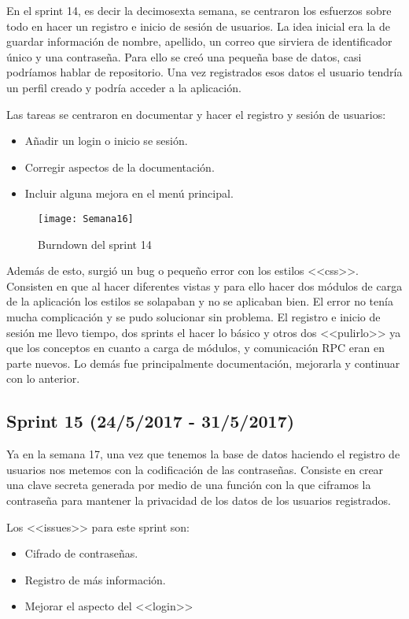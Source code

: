 En el sprint 14, es decir la decimosexta semana, se centraron los esfuerzos sobre todo en hacer un registro e inicio de sesión de usuarios. La idea inicial era la de guardar información de nombre, apellido, un correo que sirviera de identificador único y una contraseña. Para ello se creó una pequeña base de datos, casi podríamos hablar de repositorio. Una vez registrados esos datos el usuario tendría un perfil creado y podría acceder a la aplicación.

Las tareas se centraron en documentar y hacer el registro y sesión de usuarios:
\begin{itemize}
\item Añadir un login o inicio se sesión.
\item Corregir aspectos de la documentación.
\item Incluir alguna mejora en el menú principal.
\end{itemize}

\begin{figure}[h]
\centering
\texttt{[image: Semana16]}
\caption{Burndown del sprint 14}
\label{fig:A.2.6}
\end{figure}

Además de esto, surgió un bug o pequeño error con los estilos <<css>>. Consisten en que al hacer diferentes vistas y para ello hacer dos módulos de carga de la aplicación los estilos se solapaban y no se aplicaban bien. El error no tenía mucha complicación y se pudo solucionar sin problema. 
El registro e inicio de sesión me llevo tiempo, dos sprints el hacer lo básico y otros dos <<pulirlo>> ya que los conceptos en cuanto a carga de módulos, y comunicación RPC eran en parte nuevos. Lo demás fue principalmente documentación, mejorarla y continuar con lo anterior.

\subsection{Sprint 15 (24/5/2017 - 31/5/2017)}

Ya en la semana 17, una vez que tenemos la base de datos haciendo el registro de usuarios nos metemos con la codificación de las contraseñas. Consiste en crear una clave secreta generada por medio de una función con la que ciframos la contraseña para mantener la privacidad de los datos de los usuarios registrados. 

Los <<issues>> para este sprint son:
\begin{itemize}
\item Cifrado de contraseñas.
\item Registro de más información.
\item Mejorar el aspecto del <<login>>
\end{itemize}

